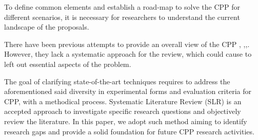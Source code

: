 \documentclass{IEEEtran}
\newcommand\mia[1]{{\color{red}#1}}%
\begin{document}




To define common elements and establish a road-map to solve the CPP for different scenarios, it is necessary for researchers to understand the current landscape of the proposals.

There have been previous attempts to provide an overall view of the CPP \cite{SoXi17}, \cite{KuSr18},\cite{HuGu17},\cite{TaAl17}. However, they lack a systematic approach for the review, which could cause to left out essential aspects of the problem.

The goal of clarifying state-of-the-art techniques requires to address the aforementioned said diversity in experimental forms and evaluation criteria for CPP, with a methodical process. Systematic Literature Review  (SLR) \cite{BuBr06} is an accepted approach to investigate specific research questions and objectively review the literature. In this paper, we adopt such method aiming to identify research gaps and provide a solid foundation for future CPP research activities.
\end{document}
